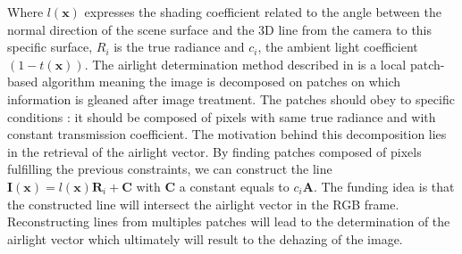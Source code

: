 \documentclass[conference]{IEEEtran}
\begin{document}
Where $l(\mathbf{x})$ expresses the shading coefficient related to the angle between the normal direction of the scene surface and
the 3D line from the camera to this specific surface, $R_i$ is the true radiance and $c_i$, the ambient light coefficient $(1-t(\mathbf{x}))$.
The airlight determination method described in \cite{airlight} is a local patch-based algorithm meaning the image is decomposed on patches on which information is
gleaned after image treatment.  The patches should obey to specific conditions : it should be composed of pixels with same
true radiance and with constant transmission coefficient. The motivation behind this decomposition lies in the retrieval of the airlight
vector.  By finding patches composed of pixels fulfilling the previous constraints, we can construct the line $\mathbf{I}(\mathbf{x}) = l(\mathbf{x}) \mathbf{R}_i + \mathbf{C}$ 
with $\mathbf{C}$ a constant equals to $c_i \mathbf{A}$. The funding idea is that the constructed line will intersect the airlight vector in the RGB frame.
Reconstructing lines from multiples patches will lead to the determination of the airlight vector which ultimately will result to
the dehazing of the image.
\end{document}
